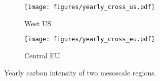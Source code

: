 \begin{figure}[t]
  \centering%
 \begin{subfigure}{0.45\linewidth}%
 \centering
       \texttt{[image: figures/yearly\_cross\_us.pdf]}%
       \caption{West US}
       \label{fig:cv_yearly_r2}
    \end{subfigure}%
\hfill%
\begin{subfigure}{0.45\linewidth}%
        \centering
       \texttt{[image: figures/yearly\_cross\_eu.pdf]}%
       \caption{Central EU}
       \label{fig:cv_yearly_r3}
    \end{subfigure}%
    \caption{Yearly carbon intensity of two mesoscale regions.}%
    \label{fig:cv_yearly}%
\end{figure}


